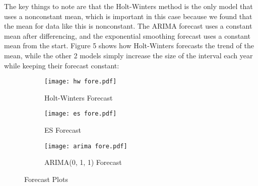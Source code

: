 \documentclass[12pt]{article}
\begin{document}
The key things to note are that the Holt-Winters method is the only model that uses a nonconstant mean, which is important in this case because we found that the mean for data like this is nonconstant. The ARIMA forecast uses a constant mean after differencing, and the exponential smoothing forecast uses a constant mean from the start. Figure 5 shows how Holt-Winters forecasts the trend of the mean, while the other 2 models simply increase the size of the interval each year while keeping their forecast constant:\\
\begin{figure}[h]
\begin{subfigure}{0.32\textwidth}
\texttt{[image: hw fore.pdf]} 
\caption{Holt-Winters Forecast}
\label{fig:subim1}
\end{subfigure}
\begin{subfigure}{0.32\textwidth}
\texttt{[image: es fore.pdf]}
\caption{ES Forecast}
\label{fig:subim2}
\end{subfigure}
\begin{subfigure}{0.32\textwidth}
\texttt{[image: arima fore.pdf]} 
\caption{ARIMA(0, 1, 1) Forecast}
\label{fig:subim3}
\end{subfigure}
\caption{Forecast Plots}
\label{fig:Figure 5}
\end{figure}\\
\newpage
\end{document}
